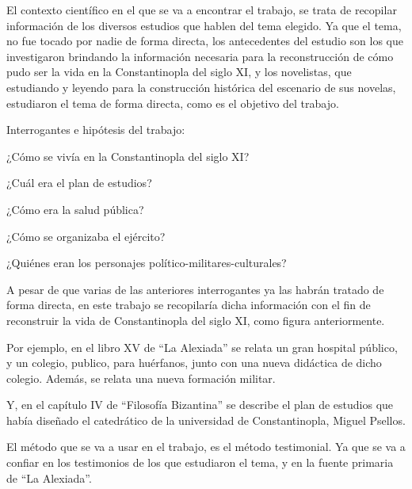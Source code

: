 
	El contexto científico en el que se va a encontrar el trabajo, se trata de recopilar información de los diversos estudios que hablen del tema elegido. Ya que el tema, no fue tocado por nadie de forma directa, los antecedentes del estudio son los que investigaron brindando la información necesaria para la reconstrucción de cómo pudo ser la vida en la Constantinopla del siglo XI, y los novelistas, que estudiando y leyendo para la construcción histórica del escenario de sus novelas, estudiaron el tema de forma directa, como es el objetivo del trabajo.

Interrogantes e hipótesis del trabajo:

¿Cómo se vivía en la Constantinopla del siglo XI?

¿Cuál era el plan de estudios?

¿Cómo era la salud pública?

¿Cómo se organizaba el ejército?

¿Quiénes eran los personajes político-militares-culturales?

	A pesar de que varias de las anteriores interrogantes ya las habrán tratado de forma directa, en este trabajo se recopilaría dicha información con el fin de reconstruir la vida de Constantinopla del siglo XI, como figura anteriormente.

	Por ejemplo, en el libro XV de “La Alexiada” se relata un gran hospital público, y un colegio, publico, para huérfanos, junto con una nueva didáctica de dicho colegio. Además, se relata una nueva formación militar.

		Y, en el capítulo IV de “Filosofía Bizantina” se describe el plan de estudios que había diseñado el catedrático de la universidad de Constantinopla, Miguel Psellos.

	El método que se va a usar en el trabajo, es el método testimonial. Ya que se va a confiar en los testimonios de los que estudiaron el tema, y en la fuente primaria de “La Alexiada”.
